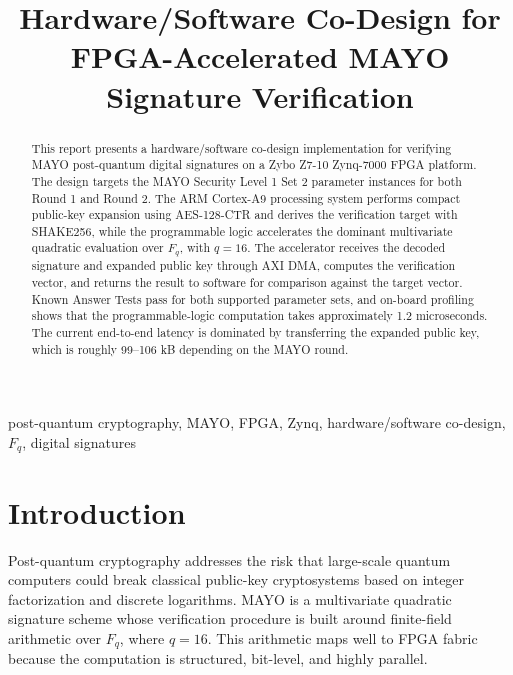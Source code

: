 \documentclass[conference]{IEEEtran}
\begin{document}
\title{Hardware/Software Co-Design for FPGA-Accelerated MAYO Signature Verification}

\author{
}

\maketitle
\thispagestyle{plain}
\pagestyle{plain}

\begin{abstract}
This report presents a hardware/software co-design implementation for verifying MAYO post-quantum digital signatures on a Zybo Z7-10 Zynq-7000 FPGA platform. The design targets the MAYO Security Level 1 Set 2 parameter instances for both Round 1 and Round 2. The ARM Cortex-A9 processing system performs compact public-key expansion using AES-128-CTR and derives the verification target with SHAKE256, while the programmable logic accelerates the dominant multivariate quadratic evaluation over \(F_q\), with \(q=16\). The accelerator receives the decoded signature and expanded public key through AXI DMA, computes the verification vector, and returns the result to software for comparison against the target vector. Known Answer Tests pass for both supported parameter sets, and on-board profiling shows that the programmable-logic computation takes approximately 1.2 microseconds. The current end-to-end latency is dominated by transferring the expanded public key, which is roughly 99--106 kB depending on the MAYO round.
\end{abstract}

\begin{IEEEkeywords}
post-quantum cryptography, MAYO, FPGA, Zynq, hardware/software co-design, \(F_q\), digital signatures
\end{IEEEkeywords}

\section{Introduction}
Post-quantum cryptography addresses the risk that large-scale quantum computers could break classical public-key cryptosystems based on integer factorization and discrete logarithms. MAYO is a multivariate quadratic signature scheme whose verification procedure is built around finite-field arithmetic over \(F_q\), where \(q=16\). This arithmetic maps well to FPGA fabric because the computation is structured, bit-level, and highly parallel.
\end{document}
